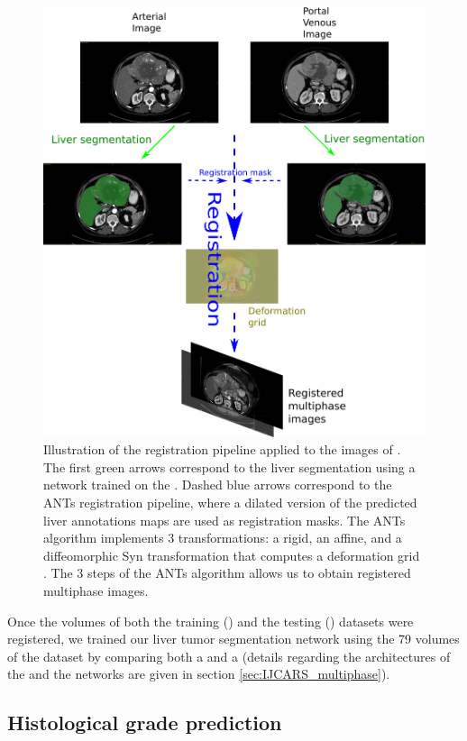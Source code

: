 \begin{figure}[th!]
\centering
\includegraphics[width=0.7\linewidth]{../HistologicalGradePrediction/images/ResizeRegistrationTCIA_pipeline_vertical3}
\caption{Illustration of the registration pipeline applied to the images of \textbf{}. The first green arrows correspond to the liver segmentation using a network trained on the \textbf{}. Dashed blue arrows correspond to the ANTs registration pipeline, where a dilated version of the predicted liver annotations maps are used as registration masks. The ANTs algorithm implements 3 transformations: a rigid, an affine, and a diffeomorphic Syn transformation that computes a deformation grid \cite{Avants2008}. The 3 steps of the ANTs algorithm allows us to obtain registered multiphase images.}
\label{fig:RegistrationTCIA_pipeline_vertical2}
\end{figure}

Once the volumes of both the training (\textbf{}) and the testing (\textbf{}) datasets were registered, we trained our liver tumor segmentation network using the 79 volumes of the \textbf{} dataset by comparing both a  and a  (details regarding the architectures of the  and the  networks are given in section \ref{sec:IJCARS_multiphase}).


\subsection{Histological grade prediction}\label{subsect_hist_grad_pred}

